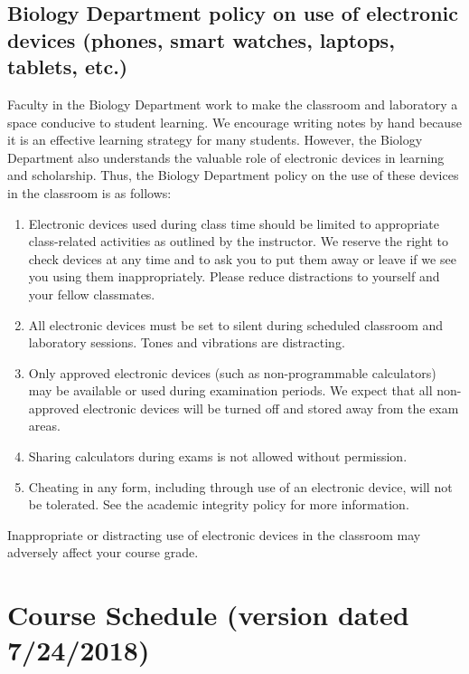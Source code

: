 \documentclass{tufte-handout}
\begin{document}
\begin{fullwidth}

\subsection{Biology Department policy on use of electronic devices (phones, smart watches, laptops, tablets, etc.)}

Faculty in the Biology Department work to make the classroom and laboratory a space conducive to student learning. We encourage writing notes by hand because it is an effective learning strategy for many students. However, the Biology Department also understands the valuable role of electronic devices in learning and scholarship. Thus, the Biology Department policy on the use of these devices in the classroom is as follows:


\begin{enumerate}
\item Electronic devices used during class time should be limited to appropriate class-related activities as outlined by the instructor. We reserve the right to check devices at any time and to ask you to put them away or leave if we see you using them inappropriately. Please reduce distractions to yourself and your fellow classmates.
\item All electronic devices must be set to silent during scheduled classroom and laboratory sessions. Tones and vibrations are distracting.
\item Only approved electronic devices (such as non-programmable calculators) may be available or used during examination periods. We expect that all non-approved electronic devices will be turned off and stored away from the exam areas.
\item Sharing calculators during exams is not allowed without permission. 
\item Cheating in any form, including through use of an electronic device, will not be tolerated. See the academic integrity policy for more information.
\end{enumerate}

Inappropriate or distracting use of electronic devices in the classroom may adversely affect your course grade. 





\newpage

\section{Course Schedule (version dated 7/24/2018)}


\end{fullwidth}
\end{document}
